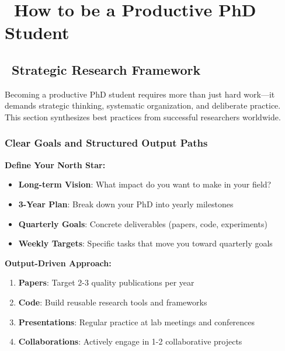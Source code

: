 \documentclass[11pt,a4paper]{article}
\begin{document}
\newpage


\newpage

\section{\faRocket~How to be a Productive PhD Student}

\subsection{\faCompass~Strategic Research Framework}

\begin{tcolorbox}[colback=blue!5,colframe=darkblue,title=The Foundation of PhD Success]
Becoming a productive PhD student requires more than just hard work—it demands strategic thinking, systematic organization, and deliberate practice. This section synthesizes best practices from successful researchers worldwide.
\end{tcolorbox}

\subsubsection{Clear Goals and Structured Output Paths}

\textbf{Define Your North Star:}
\begin{itemize}
    \item \textbf{Long-term Vision}: What impact do you want to make in your field?
    \item \textbf{3-Year Plan}: Break down your PhD into yearly milestones
    \item \textbf{Quarterly Goals}: Concrete deliverables (papers, code, experiments)
    \item \textbf{Weekly Targets}: Specific tasks that move you toward quarterly goals
\end{itemize}

\textbf{Output-Driven Approach:}
\begin{enumerate}
    \item \textbf{Papers}: Target 2-3 quality publications per year
    \item \textbf{Code}: Build reusable research tools and frameworks
    \item \textbf{Presentations}: Regular practice at lab meetings and conferences
    \item \textbf{Collaborations}: Actively engage in 1-2 collaborative projects
\end{enumerate}
\end{document}
